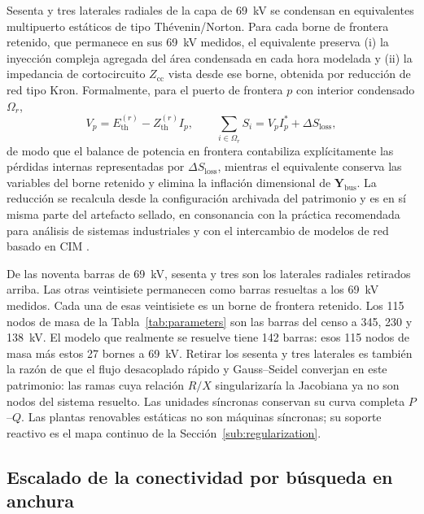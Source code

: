 Sesenta y tres laterales radiales de la capa de 69~kV se condensan en equivalentes multipuerto estáticos de tipo Th\'evenin/Norton. Para cada borne de frontera retenido, que permanece en sus 69~kV medidos, el equivalente preserva (i) la inyección compleja agregada del área condensada en cada hora modelada y (ii) la impedancia de cortocircuito $Z_{\mathrm{cc}}$ vista desde ese borne, obtenida por reducción de red tipo Kron. Formalmente, para el puerto de frontera $p$ con interior condensado $\Omega_r$,
\begin{equation}
V_p = E_{\mathrm{th}}^{(r)} - Z_{\mathrm{th}}^{(r)} I_p, \qquad \sum_{i \in \Omega_r} S_i = V_p I_p^{*} + \Delta S_{\mathrm{loss}},
\label{eq:thevenin}
\end{equation}
de modo que el balance de potencia en frontera contabiliza explícitamente las pérdidas internas representadas por $\Delta S_{\mathrm{loss}}$, mientras el equivalente conserva las variables del borne retenido y elimina la inflación dimensional de $\mathbf{Y}_{\mathrm{bus}}$. La reducción se recalcula desde la configuración archivada del patrimonio y es en sí misma parte del artefacto sellado, en consonancia con la práctica recomendada para análisis de sistemas industriales \cite{ieee399} y con el intercambio de modelos de red basado en CIM \cite{iec61970}.

De las noventa barras de 69~kV, sesenta y tres son los laterales radiales retirados arriba. Las otras veintisiete permanecen como barras resueltas a los 69~kV medidos. Cada una de esas veintisiete es un borne de frontera retenido. Los 115 nodos de masa de la Tabla~\ref{tab:parameters} son las barras del censo a 345, 230 y 138~kV. El modelo que realmente se resuelve tiene 142 barras: esos 115 nodos de masa más estos 27 bornes a 69~kV. Retirar los sesenta y tres laterales es también la razón de que el flujo desacoplado rápido y Gauss--Seidel converjan en este patrimonio: las ramas cuya relación $R/X$ singularizaría la Jacobiana ya no son nodos del sistema resuelto. Las unidades síncronas conservan su curva completa $P$--$Q$. Las plantas renovables estáticas no son máquinas síncronas; su soporte reactivo es el mapa continuo de la Sección~\ref{sub:regularization}.


\subsection{Escalado de la conectividad por búsqueda en anchura}
\label{sub:bfs}


